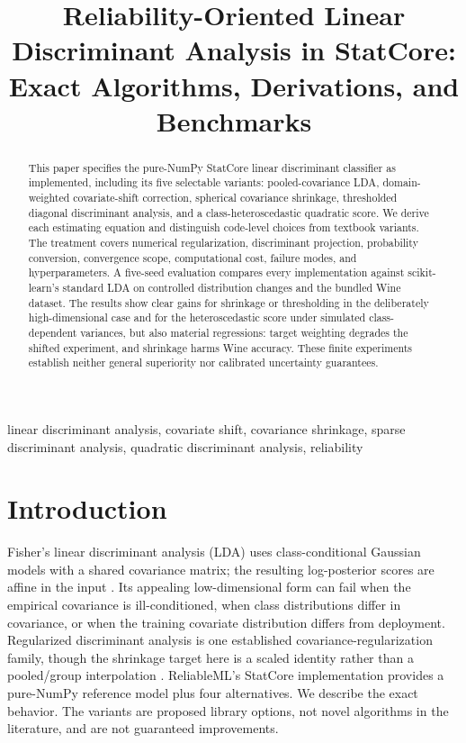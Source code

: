 \documentclass[conference]{IEEEtran}
\title{Reliability-Oriented Linear Discriminant Analysis in StatCore: Exact Algorithms, Derivations, and Benchmarks}
\author{\jabulaniauthor\and\martinchanzauthor\and\oloratoauthor\and\mfundoauthor}
\begin{document}
\maketitle
\begin{abstract}
This paper specifies the pure-NumPy StatCore linear discriminant classifier as implemented, including its five selectable variants: pooled-covariance LDA, domain-weighted covariate-shift correction, spherical covariance shrinkage, thresholded diagonal discriminant analysis, and a class-heteroscedastic quadratic score. We derive each estimating equation and distinguish code-level choices from textbook variants. The treatment covers numerical regularization, discriminant projection, probability conversion, convergence scope, computational cost, failure modes, and hyperparameters. A five-seed evaluation compares every implementation against scikit-learn's standard LDA on controlled distribution changes and the bundled Wine dataset. The results show clear gains for shrinkage or thresholding in the deliberately high-dimensional case and for the heteroscedastic score under simulated class-dependent variances, but also material regressions: target weighting degrades the shifted experiment, and shrinkage harms Wine accuracy. These finite experiments establish neither general superiority nor calibrated uncertainty guarantees.
\end{abstract}
\begin{IEEEkeywords}
linear discriminant analysis, covariate shift, covariance shrinkage, sparse discriminant analysis, quadratic discriminant analysis, reliability
\end{IEEEkeywords}

\section{Introduction}
Fisher's linear discriminant analysis (LDA) uses class-conditional Gaussian models with a shared covariance matrix; the resulting log-posterior scores are affine in the input \cite{fisher1936,anderson1958}. Its appealing low-dimensional form can fail when the empirical covariance is ill-conditioned, when class distributions differ in covariance, or when the training covariate distribution differs from deployment. Regularized discriminant analysis is one established covariance-regularization family, though the shrinkage target here is a scaled identity rather than a pooled/group interpolation \cite{friedman1989}. ReliableML's StatCore implementation provides a pure-NumPy reference model plus four alternatives. We describe the exact  behavior. The variants are proposed library options, not novel algorithms in the literature, and are not guaranteed improvements.
\end{document}

